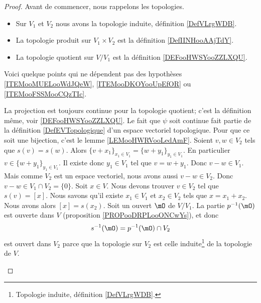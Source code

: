 \begin{proof}
	Avant de commencer, nous rappelons les topologies.
	\begin{itemize}
		\item Sur \( V_1\) et \( V_2\) nous avons la topologie induite, définition \ref{DefVLrgWDB}.
		\item La topologie produit sur \( V_1\times V_2\) est la définition \ref{DefIINHooAAjTdY}.
		\item La topologie quotient sur \( V/V_1\) est la définition \ref{DEFooHWSYooZZLXQU}.
	\end{itemize}

	Voici quelque points qui ne dépendent pas des hypothèses \ref{ITEMooMUELooWdJQeW}, \ref{ITEMooDKOYooUpEfOR} ou \ref{ITEMooFSSMooCQzTIc}.
	\begin{subproof}
		La projection est toujours continue pour la topologie quotient; c'est la définition même, voir \ref{DEFooHWSYooZZLXQU}.
		Le fait que \( \psi\) soit continue fait partie de la définition \ref{DefEVTopologique} d'un espace vectoriel topologique. Pour que ce soit une bijection, c'est le lemme \ref{LEMooHWRVooLedAmF}.
		Soient \( v,w\in V_2\) tels que \( s(v)=s(w)\). Alors \( \{ v+x_1 \}_{x_1\in V_1}=\{ w+y_1 \}_{y_1\in V_1}\). En particulier \( v\in \{ w+y_1 \}_{y_1\in V_1}\). Il existe donc \( y_1\in V_1\) tel que \( v=w+y_1\). Donc \( v-w\in V_1\). Mais comme \( V_2\) est un espace vectoriel, nous avons aussi \( v-w\in V_2\). Donc \( v-w\in V_1\cap V_2=\{ 0 \}\).
		Soit \( x\in V\). Nous devons trouver \( v\in V_2\) tel que \( s(v)=[x]\). Nous savons qu'il existe \( x_1\in V_1\) et \( x_2\in V_2\) tels que \( x=x_1+x_2\). Nous avons alors \( [x]=s(x_2)\).
		Soit un ouvert \( \mO\) de \( V/V_1\). La partie \( p^{-1}(\mO)\) est ouverte dans \( V\) (proposition \ref{PROPooDRPLooONCwYs}), et donc
		\begin{equation}
			s^{-1}(\mO)=p^{-1}(\mO)\cap V_2
		\end{equation}
		est ouvert dans \( V_2\) parce que la topologie sur \( V_2\) est celle induite\footnote{Topologie induite, définition \ref{DefVLrgWDB}.} de la topologie de \( V\).
	\end{subproof}


\end{proof}
